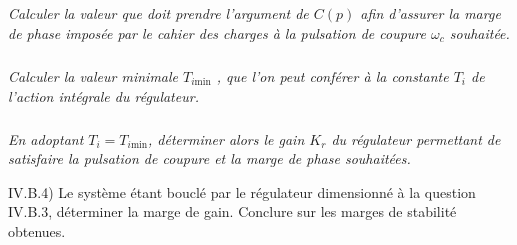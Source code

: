 \documentclass[10pt,fleqn]{article} %
\begin{document}
\begin{multicols}{2}
\subparagraph{}\textit{Calculer la valeur que doit prendre l’argument de $C(p)$ afin d’assurer
la marge de phase imposée par le cahier des charges à la pulsation de coupure $\omega_c$
souhaitée.}

\subparagraph{}\textit{Calculer la valeur minimale $T_{i\text{min}}$ , que l’on peut conférer à la constante $T_i$ de l’action intégrale du régulateur.}


\subparagraph{}\textit{En adoptant $T_i=T_{i\text{min}}$, déterminer alors le gain $K_r$ du régulateur permettant de satisfaire la pulsation de coupure et la marge de phase souhaitées.
}

IV.B.4) Le système étant bouclé par le régulateur dimensionné à la question
IV.B.3, déterminer la marge de gain. Conclure sur les marges de stabilité obtenues.
\subparagraph{}\textit{}

\subparagraph{}\textit{}

\subparagraph{}\textit{}

\subparagraph{}\textit{}
%

\end{multicols}

%
\end{document}
